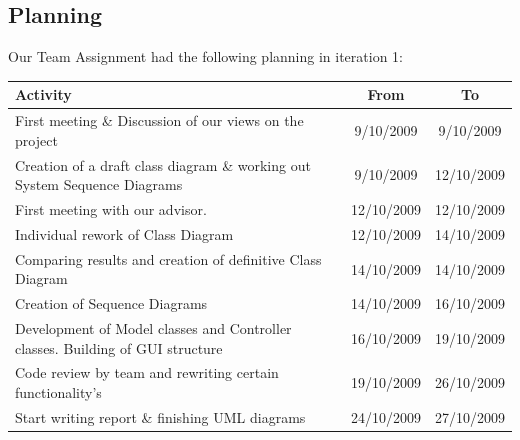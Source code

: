 		\subsection{Planning}
		Our Team Assignment had the following planning in iteration 1:\\
		\begin{tabular}{p{200 pt}|c|c}
		Activity & From & To\\
		\hline
		First meeting \& Discussion of our views on the project & 9/10/2009 & 9/10/2009\\ \hline
		Creation of a draft class diagram \& working out System Sequence Diagrams & 9/10/2009 & 12/10/2009\\ \hline
		First meeting with our advisor. & 12/10/2009 & 12/10/2009\\ \hline
		Individual rework of Class Diagram & 12/10/2009 & 14/10/2009\\ \hline
		Comparing results and creation of definitive Class Diagram & 14/10/2009 & 14/10/2009\\ \hline
		Creation of Sequence Diagrams & 14/10/2009 & 16/10/2009\\ \hline
		Development of Model classes and Controller classes. Building of GUI structure & 16/10/2009 & 19/10/2009\\ \hline
		Code review by team and rewriting certain functionality's & 19/10/2009 & 26/10/2009\\ \hline
		Start writing report \& finishing UML diagrams & 24/10/2009 & 27/10/2009\\ \hline
		\end{tabular}

